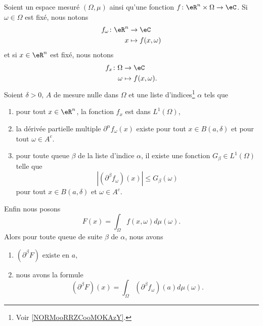 \begin{proposition}     \label{PROPooJKXJooLxgEGd}
	Soient un espace mesuré \( (\Omega,\mu)\) ainsi qu'une fonction \( f\colon \eR^n\times \Omega\to \eC\). Si \( \omega\in \Omega\) est fixé, nous notons
	\begin{equation}
		\begin{aligned}
			f_{\omega}\colon \eR^n & \to \eC             \\
			x                      & \mapsto f(x,\omega)
		\end{aligned}
	\end{equation}
	et si \( x\in \eR^n\) est fixé, nous notons
	\begin{equation}
		\begin{aligned}
			f_x\colon \Omega & \to \eC              \\
			\omega           & \mapsto f(x,\omega).
		\end{aligned}
	\end{equation}
	Soient \( \delta>0\), \( A\) de mesure nulle dans \( \Omega\) et une liste d'indices\footnote{Voir \ref{NORMooRRZCooMOKAzY}.} \( \alpha\) tels que
	\begin{enumerate}
		\item
		      pour tout \( x\in \eR^n\), la fonction \( f_x\) est dans \( L^1(\Omega)\),
		\item
		      la dérivée partielle multiple \( \partial^{\alpha}f_{\omega}(x)\) existe pour tout \( x\in B(a,\delta)\) et pour tout \( \omega\in A^c\).
		\item pour toute queue \( \beta\) de la liste d'indice \( \alpha\), il existe une fonction \( G_{\beta}\in L^1(\Omega)\) telle que
		      \begin{equation}
			      | (\partial^{\beta}f_{\omega})(x) |\leq G_{\beta}(\omega)
		      \end{equation}
		      pour tout \( x\in B(a,\delta)\) et \( \omega\in A^{c}\).
	\end{enumerate}
	Enfin nous posons
	\begin{equation}
		F(x)=\int_{\Omega}f(x,\omega)d\mu(\omega).
	\end{equation}
	Alors pour toute queue de suite \( \beta\) de \( \alpha\), nous avons
	\begin{enumerate}
		\item
		      \( (\partial^{\beta}F)\) existe en \( a\),
		\item
		      nous avons la formule
		      \begin{equation}        \label{EQooTDDWooAcLRwX}
			      (\partial^{\beta}F)(x)=\int_{\Omega}(\partial^{\beta}f_{\omega})(a)d\mu(\omega).
		      \end{equation}
	\end{enumerate}
\end{proposition}

